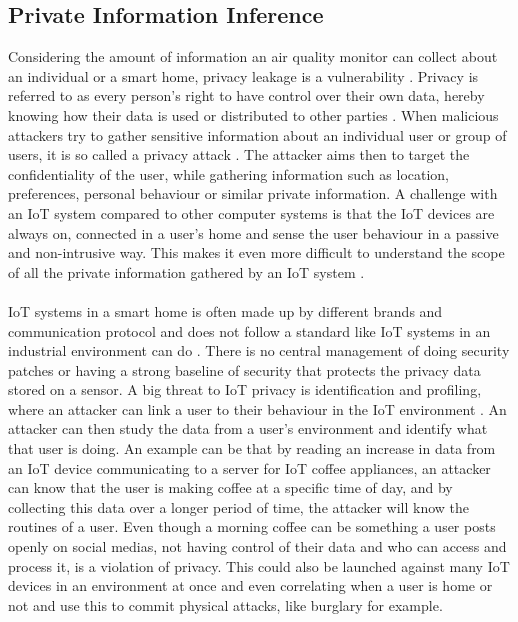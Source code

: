 \subsection{Private Information Inference}
Considering the amount of information an air quality monitor can collect about an individual or a smart home, privacy leakage is a vulnerability \cite{SecPrivSmartCity}. Privacy is referred to as every person's right to have control over their own data, hereby knowing how their data is used or distributed to other parties \cite{IoTSecPrivSafeEth}. When malicious attackers try to gather sensitive information about an individual user or group of users, it is so called a privacy attack \cite{CyberEntitySecInIoT}. The attacker aims then to target the confidentiality of the user, while gathering information such as location, preferences, personal behaviour or similar private information. A challenge with an IoT system compared to other computer systems is that the IoT devices are always on, connected in a user's home and sense the user behaviour in a passive and non-intrusive way. This makes it even more difficult to understand the scope of all the private information gathered by an IoT system \cite{IoTSecPrivSafeEth}.
\\\\
IoT systems in a smart home is often made up by different brands and communication protocol and does not follow a standard like IoT systems in an industrial environment can do \cite{IoTPrivSecSmarthome}. There is no central management of doing security patches or having a strong baseline of security that protects the privacy data stored on a sensor. A big threat to IoT privacy is identification and profiling, where an attacker can link a user to their behaviour in the IoT environment \cite{IoTSecPrivSafeEth}. An attacker can then study the data from a user's environment and identify what that user is doing. An example can be that by reading an increase in data from an IoT device communicating to a server for IoT coffee appliances, an attacker can know that the user is making coffee at a specific time of day, and by collecting this data over a longer period of time, the attacker will know the routines of a user. Even though a morning coffee can be something a user posts openly on social medias, not having control of their data and who can access and process it, is a violation of privacy. This could also be launched against many IoT devices in an environment at once and even correlating when a user is home or not and use this to commit physical attacks, like burglary for example. 

